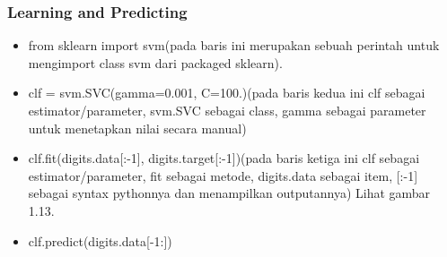 \subsubsection{Learning and Predicting}
\begin{itemize}
\item from sklearn import svm(pada baris ini merupakan sebuah perintah untuk mengimport class svm dari packaged sklearn).
\item clf = svm.SVC(gamma=0.001, C=100.)(pada baris kedua ini clf sebagai estimator/parameter, svm.SVC sebagai class, gamma sebagai parameter untuk menetapkan nilai secara manual)
\item clf.fit(digits.data[:-1], digits.target[:-1])(pada baris ketiga ini clf sebagai estimator/parameter, fit sebagai metode, digits.data sebagai item, [:-1] sebagai syntax pythonnya dan menampilkan outputannya) Lihat gambar 1.13.
\item clf.predict(digits.data[-1:])
\end{itemize}
